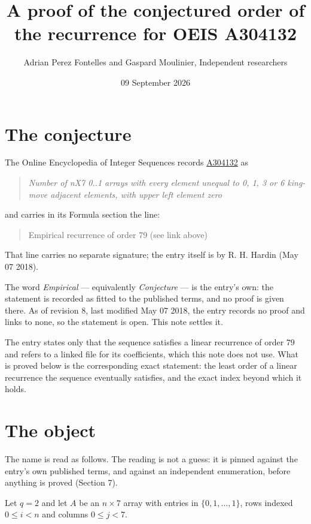 \documentclass[11pt]{article}
\title{A proof of the conjectured order of the recurrence for OEIS A304132}
\author{Adrian Perez Fontelles and Gaspard Moulinier, Independent researchers}
\date{09 September 2026}
\theoremstyle{definition}
\begin{document}
\maketitle
\section{The conjecture}

The Online Encyclopedia of Integer Sequences records \href{https://oeis.org/A304132}{A304132} as

\begin{quote}\itshape Number of nX7 0..1 arrays with every element unequal to 0, 1, 3 or 6 king-move adjacent elements, with upper left element zero\end{quote}

and carries in its Formula section the line:

\begin{quote}\ttfamily Empirical recurrence of order 79 (see link above)\end{quote}

That line carries no separate signature; the entry itself is by R. H. Hardin (May 07 2018).

The word {\itshape Empirical} --- equivalently {\itshape Conjecture} --- is the entry's own: the statement is recorded as fitted to the published terms, and no proof is given there. As of revision 8, last modified May 07 2018, the entry records no proof and links to none, so the statement is open. This note settles it.

The entry states only that the sequence satisfies a linear recurrence of order $79$ and refers to a linked file for its coefficients, which this note does not use. What is proved below is the corresponding exact statement: the least order of a linear recurrence the sequence eventually satisfies, and the exact index beyond which it holds.

\section{The object}

The name is read as follows. The reading is not a guess: it is pinned against the entry's own published terms, and against an independent enumeration, before anything is proved (Section 7).

Let $q = 2$ and let $A$ be an $n \times 7$ array with entries in $\{0,1,\dots,1\}$, rows indexed $0 \le i < n$ and columns $0 \le j < 7$.
\end{document}
